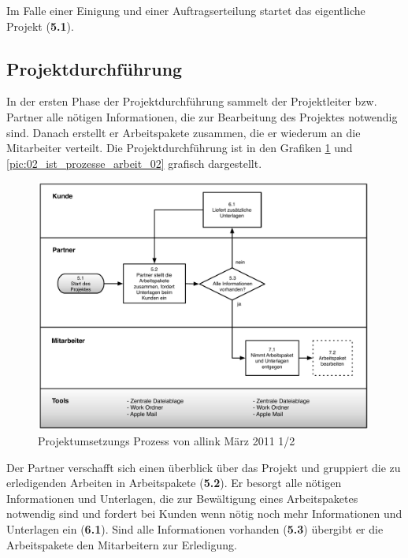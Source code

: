 Im Falle einer Einigung und einer Auftragserteilung startet das eigentliche
Projekt (\textbf{5.1}).

\clearpage

\subsection{Projektdurchführung}
In der ersten Phase der Projektdurchführung sammelt der Projektleiter bzw.
Partner alle nötigen Informationen, die zur Bearbeitung des Projektes notwendig sind.
Danach erstellt er Arbeitspakete zusammen, die er wiederum an die Mitarbeiter verteilt.
Die Projektdurchführung ist in den Grafiken \ref{pic:02_ist_prozesse_arbeit_01} und 
\ref{pic:02_ist_prozesse_arbeit_02} grafisch dargestellt.

\begin{figure}[htbp]
\begin{center}
\includegraphics[width=0.99\textwidth,angle=0]{./bilder/analyse/02_ist_prozesse_arbeit_01.pdf}
\caption{Projektumsetzungs Prozess von allink März 2011 1/2}
\label{pic:02_ist_prozesse_arbeit_01}
\end{center}
\end{figure}

Der Partner verschafft sich einen überblick über das Projekt und gruppiert
die zu erledigenden Arbeiten in Arbeitspakete (\textbf{5.2}). Er besorgt alle nötigen Informationen
und Unterlagen, die zur Bewältigung eines Arbeitspaketes notwendig sind und fordert
bei Kunden wenn nötig noch mehr Informationen und Unterlagen ein (\textbf{6.1}).
Sind alle Informationen vorhanden (\textbf{5.3}) übergibt er die Arbeitspakete
den Mitarbeitern zur Erledigung.

